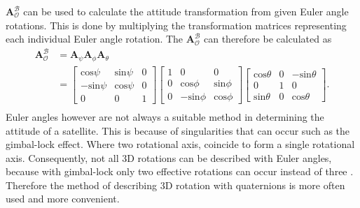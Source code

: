 $\boldsymbol{A}^{\mathcal{B}}_{\mathcal{O}}$ can be used to calculate the attitude transformation from given Euler angle rotations. This is done by multiplying the transformation matrices representing each individual Euler angle rotation. The $\boldsymbol{A}^{\mathcal{B}}_{\mathcal{O}}$ can therefore be calculated as 
\begin{equation}
	\begin{aligned}
		\boldsymbol{A}^{\mathcal{B}}_{\mathcal{O}} &= \boldsymbol{A}_{\psi} \boldsymbol{A}_{\phi} \boldsymbol{A}_{\theta} \\
			&= \begin{bmatrix}
			\text{cos} \psi & \text{sin} \psi & 0 \\
			-\text{sin} \psi & \text{cos} \psi & 0 \\
			0 & 0 & 1
			\end{bmatrix} \begin{bmatrix}
			1 & 0 & 0 \\
			0 & \text{cos} \phi & \text{sin} \phi \\
			0 & -\text{sin} \phi & \text{cos} \phi
			\end{bmatrix} \begin{bmatrix}
			\text{cos} \theta &  0 & -\text{sin} \theta \\
			0 & 1 & 0 \\
			\text{sin} \theta & 0 & \text{cos} \theta
			\end{bmatrix}. \\
	\end{aligned}
\end{equation}
Euler angles however are not always a suitable method in determining the attitude of a satellite. This is because of singularities that can occur such as the gimbal-lock effect. Where two rotational axis, coincide to form a single rotational axis. Consequently, not all $3$D rotations can be described with Euler angles, because with gimbal-lock only two effective rotations can occur instead of three \cite{diebel2006representing}. Therefore the method of describing $3$D rotation with quaternions is more often used and more convenient. 

